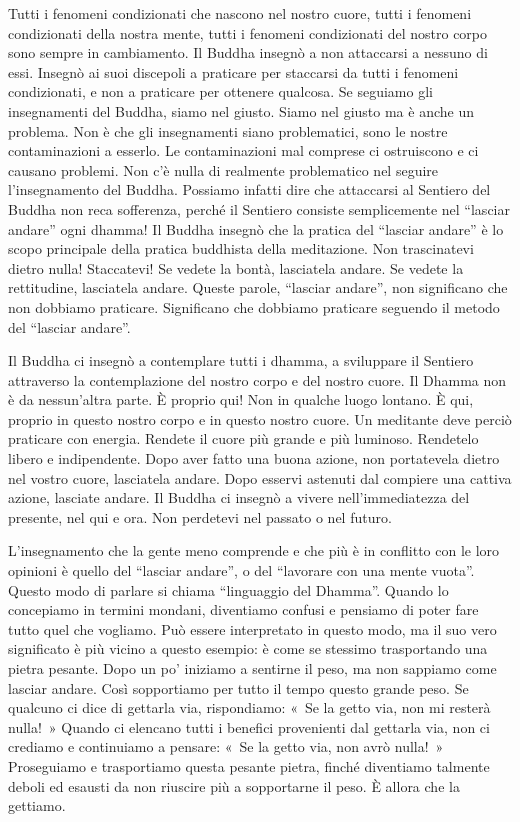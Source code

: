 Tutti i fenomeni condizionati che nascono nel nostro cuore, tutti i
fenomeni condizionati della nostra mente, tutti i fenomeni condizionati
del nostro corpo sono sempre in cambiamento. Il Buddha insegnò a non
attaccarsi a nessuno di essi. Insegnò ai suoi discepoli a praticare per
staccarsi da tutti i fenomeni condizionati, e non a praticare per
ottenere qualcosa. Se seguiamo gli insegnamenti del Buddha, siamo nel
giusto. Siamo nel giusto ma è anche un problema. Non è che gli
insegnamenti siano problematici, sono le nostre contaminazioni a
esserlo. Le contaminazioni mal comprese ci ostruiscono e ci causano
problemi. Non c'è nulla di realmente problematico nel seguire
l'insegnamento del Buddha. Possiamo infatti dire che attaccarsi al
Sentiero del Buddha non reca sofferenza, perché il Sentiero consiste
semplicemente nel ``lasciar andare'' ogni dhamma! Il Buddha
insegnò che la pratica del ``lasciar andare'' è lo scopo principale
della pratica buddhista della meditazione. Non trascinatevi dietro
nulla! Staccatevi! Se vedete la bontà, lasciatela andare. Se vedete la
rettitudine, lasciatela andare. Queste parole, ``lasciar andare'', non
significano che non dobbiamo praticare. Significano che dobbiamo
praticare seguendo il metodo del ``lasciar andare''.

Il Buddha ci insegnò a contemplare tutti i dhamma, a sviluppare
il Sentiero attraverso la contemplazione del nostro corpo e del nostro
cuore. Il Dhamma non è da nessun'altra parte. È proprio qui! Non in
qualche luogo lontano. È qui, proprio in questo nostro corpo e in questo
nostro cuore. Un meditante deve perciò praticare con energia. Rendete il
cuore più grande e più luminoso. Rendetelo libero e indipendente. Dopo
aver fatto una buona azione, non portatevela dietro nel vostro cuore,
lasciatela andare. Dopo esservi astenuti dal compiere una cattiva
azione, lasciate andare. Il Buddha ci insegnò a vivere nell'immediatezza
del presente, nel qui e ora. Non perdetevi nel passato o nel futuro.

L'insegnamento che la gente meno comprende e che più è in conflitto con
le loro opinioni è quello del ``lasciar andare'', o del ``lavorare con
una mente vuota''. Questo modo di parlare si chiama ``linguaggio del
Dhamma''. Quando lo concepiamo in termini mondani, diventiamo confusi e
pensiamo di poter fare tutto quel che vogliamo. Può essere interpretato
in questo modo, ma il suo vero significato è più vicino a questo
esempio: è come se stessimo trasportando una pietra pesante. Dopo un po'
iniziamo a sentirne il peso, ma non sappiamo come lasciar andare. Così
sopportiamo per tutto il tempo questo grande peso. Se qualcuno ci dice
di gettarla via, rispondiamo: «~Se la getto via, non mi resterà nulla!~»
Quando ci elencano tutti i benefici provenienti dal gettarla via, non ci
crediamo e continuiamo a pensare: «~Se la getto via, non avrò nulla!~»
Proseguiamo e trasportiamo questa pesante pietra, finché diventiamo
talmente deboli ed esausti da non riuscire più a sopportarne il peso. È
allora che la gettiamo.

